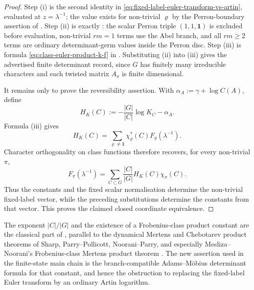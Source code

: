 \documentclass[11pt,a4paper]{amsart}
\theoremstyle{plain}
\theoremstyle{definition}
\theoremstyle{remark}
\begin{document}
\begin{proof}
  Step \textup{(i)} is the second identity in
  \eqref{eq:fixed-label-euler-transform-vs-artin}, evaluated at
  \(z=\lambda^{-1}\); the value exists for non-trivial \(\varrho\) by the
  Perron-boundary assertion of .  Step
  \textup{(ii)} is exactly : the
  scalar Perron triple \((1,1,\mathbf1)\) is excluded before evaluation,
  non-trivial \(rm=1\) terms use the Abel branch, and all \(rm\ge2\) terms are
  ordinary determinant-germ values inside the Perron disc.  Step
  \textup{(iii)} is formula \eqref{eq:class-euler-product-k-f} in
  .  Substituting \textup{(ii)} into
  \textup{(iii)} gives the advertised finite determinant record, since
  \(G\) has finitely many irreducible characters and each twisted matrix
  \(A_\pi\) is finite dimensional.

  It remains only to prove the reversibility assertion.  With
  \(\alpha_A:=\gamma+\log C(A)\), define
  \[
    H_K(C):=-\frac{|G|}{|C|}\log K_C-\alpha_A .
  \]
  Formula \textup{(iii)} gives
  \[
    H_K(C)=
    \sum_{\varrho\ne\mathbf1}\chi_\varrho^\ast(C)
      F_\varrho(\lambda^{-1}).
  \]
  Character orthogonality on class functions therefore recovers, for every
  non-trivial \(\pi\),
  \[
    F_\pi(\lambda^{-1})
    =\sum_{C\subset G}\frac{|C|}{|G|}H_K(C)\chi_\pi(C).
  \]
  Thus the constants and the fixed scalar normalisation determine the
  non-trivial fixed-label vector, while the preceding substitutions determine
  the constants from that vector.  This proves the claimed closed coordinate equivalence.
\end{proof}

The exponent \(|C|/|G|\) and the existence of a Frobenius-class product
constant are the classical part of ,
parallel to the dynamical Mertens and Chebotarev product theorems of Sharp,
Parry--Pollicott, Noorani--Parry, and especially Mesliza--Noorani's
Frobenius-class Mertens product theorem
\cite{Sharp1991Mertens,ParryPollicott1986Chebotarev,NooraniParry1992ChebotarevShifts,MeslizaNoorani1999FrobeniusMertens}.  The new assertion
used in the finite-state main chain is the branch-compatible
Adams--M\"obius determinant formula for that constant, and hence the
obstruction to replacing the fixed-label Euler transform by an ordinary
Artin logarithm.
\end{document}
